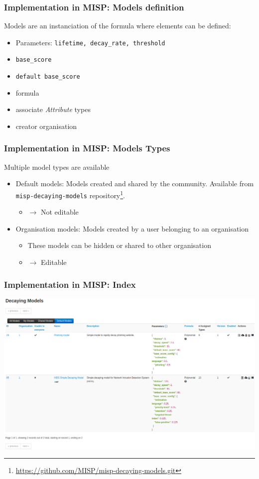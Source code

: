 \begin{frame}
    \frametitle{Implementation in MISP: Models definition}
    Models are an instanciation of the formula where elements can be defined:
    \begin{itemize}
        \item Parameters: \texttt{lifetime, decay\_rate, threshold}
        \item \texttt{base\_score}
        \item \texttt{default base\_score}
        \item formula
        \item associate \textit{Attribute} types
        \item creator organisation
    \end{itemize}
\end{frame}

\begin{frame}
    \frametitle{Implementation in MISP: Models Types}
    Multiple model types are available
    \begin{itemize}
        \item Default models: Models created and shared by the community. Available from \texttt{misp-decaying-models} repository\footnote{\url{https://github.com/MISP/misp-decaying-models.git}}.
        \begin{itemize}
            \item $\rightarrow$ Not editable
        \end{itemize}
        \item Organisation models: Models created by a user belonging to an organisation
        \begin{itemize}
            \item These models can be hidden or shared to other organisation 
            \item $\rightarrow$ Editable
        \end{itemize}
    \end{itemize}
\end{frame}

\begin{frame}
    \frametitle{Implementation in MISP: Index}
    \includegraphics[width=1.00\linewidth]{pics/decaying-index.png}
\end{frame}

